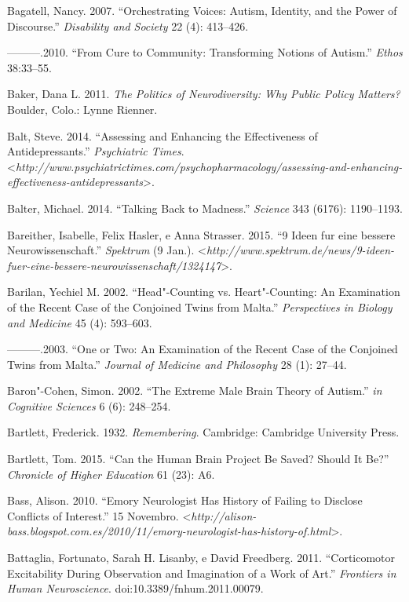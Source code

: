 Bagatell, Nancy. 2007. ``Orchestrating Voices: Autism, Identity, and the
Power of Discourse.'' \emph{Disability and Society} 22 (4): 413--426.

---------.2010. ``From Cure to Community: Transforming Notions of
Autism.'' \emph{Ethos} 38:33--55.

Baker, Dana L. 2011. \emph{The Politics of Neurodiversity: Why Public
Policy Matters?} Boulder, Colo.: Lynne Rienner.

Balt, Steve. 2014. ``Assessing and Enhancing the Effectiveness of
Antidepressants.'' \emph{Psychiatric Times}.
\textless{}\emph{http://www.psychiatrictimes.com/psychopharmacology/assessing-and-enhancing-effectiveness-antidepressants}\textgreater{}.

Balter, Michael. 2014. ``Talking Back to Madness.'' \emph{Science} 343
(6176): 1190--1193.

Bareither, Isabelle, Felix Hasler, e Anna Strasser. 2015. ``9 Ideen fur
eine bessere Neurowissenschaft.'' \emph{Spektrum} (9 Jan.).
\textless{}\emph{http://www.spektrum.de/news/9-ideen-fuer-eine-bessere-neurowissenschaft/1324147}\textgreater{}.

Barilan, Yechiel M. 2002. ``Head"-Counting vs. Heart"-Counting: An
Examination of the Recent Case of the Conjoined Twins from Malta.''
\emph{Perspectives in Biology and Medicine} 45 (4): 593--603.

---------.2003. ``One or Two: An Examination of the Recent Case of the
Conjoined Twins from Malta.'' \emph{Journal of Medicine and Philosophy}
28 (1): 27--44.

Baron"-Cohen, Simon. 2002. ``The Extreme Male Brain Theory of Autism.''
\emph{ in Cognitive Sciences} 6 (6): 248--254.

Bartlett, Frederick. 1932. \emph{Remembering}. Cambridge: Cambridge
University Press.

Bartlett, Tom. 2015. ``Can the Human Brain Project Be Saved? Should It
Be?'' \emph{Chronicle of Higher Education} 61 (23): A6.

Bass, Alison. 2010. ``Emory Neurologist Has History of Failing to
Disclose Conflicts of Interest.'' 15 Novembro.
\textless{}\emph{http://alison-bass.blogspot.com.es/2010/11/emory-neurologist-has-history-of.html}\textgreater{}.

Battaglia, Fortunato, Sarah H. Lisanby, e David Freedberg. 2011.
``Corticomotor Excitability During Observation and Imagination of a Work
of Art.'' \emph{Frontiers in Human Neuroscience}.
doi:10.3389/fnhum.2011.00079.

